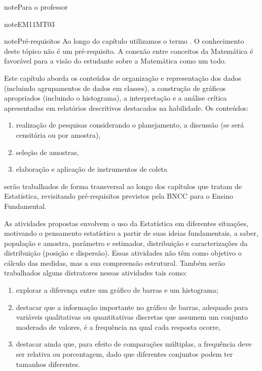 \begin{sphinxadmonition}{note}{Para o professor}
\begin{sphinxadmonition}{note}{EM11MT03}
\begin{sphinxadmonition}{note}{Pré-requisitos}
Ao longo do capítulo utilizamos o termo . O conhecimento deste tópico não é um pré-requisito. A conexão entre conceitos da Matemática é favorável para a visão do estudante sobre a Matemática como um todo.
\end{sphinxadmonition}

Este capítulo aborda os conteúdos de organização e representação dos dados (incluindo agrupamentos de dados em classes), a construção de gráficos apropriados (incluindo o histograma), a interpretação e a análise crítica apresentadas em relatórios descritivos destacados na habilidade. Os conteúdos:
\begin{enumerate}
\item {} 
realização de pesquisas considerando o planejamento, a discussão (se será censitária ou por amostra),

\item {} 
seleção de amostras,

\item {} 
elaboração e aplicação de instrumentos de coleta

\end{enumerate}

serão trabalhados de forma transversal ao  longo dos capítulos que tratam de Estatística, revisitando pré-requisitos previstos pela BNCC para o Ensino Fundamental.

As atividades propostas envolvem o uso da Estatística em diferentes situações, motivando o pensamento estatístico a partir de suas ideias fundamentais, a saber, população e amostra, parâmetro e estimador, distribuição e caracterizações da distribuição (posição e dispersão). Essas atividades não têm como objetivo o cálculo das medidas, mas a sua compreensão estrutural. Também serão trabalhados alguns distratores nessas atividades tais como:
\begin{enumerate}
\item {} 
explorar a diferença entre um gráfico de barras e um histograma;

\item {} 
destacar que a informação importante no gráfico de barras, adequado para variáveis qualitativas ou quantitativas discretas que assumem um conjunto moderado de valores, é a frequência na qual cada resposta ocorre,

\item {} 
destacar ainda que, para efeito de comparações múltiplas, a frequência deve ser relativa ou porcentagem, dado que diferentes conjuntos podem ter tamanhos diferentes.


\end{enumerate}
\end{sphinxadmonition}
\end{sphinxadmonition}
